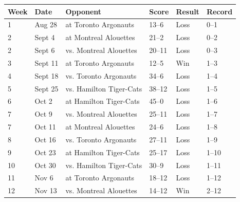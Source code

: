 \documentclass{article}
\begin{document}
\begin{tabular}{llllll}
\toprule
Week & Date & Opponent & Score & Result & Record \\
\midrule
1 & Aug 28 & at Toronto Argonauts & 13–6 & Loss & 0–1 \\
2 & Sept 4 & at Montreal Alouettes & 21–2 & Loss & 0–2 \\
2 & Sept 6 & vs. Montreal Alouettes & 20–11 & Loss & 0–3 \\
3 & Sept 11 & at Toronto Argonauts & 12–5 & Win & 1–3 \\
4 & Sept 18 & vs. Toronto Argonauts & 34–6 & Loss & 1–4 \\
5 & Sept 25 & vs. Hamilton Tiger-Cats & 38–12 & Loss & 1–5 \\
6 & Oct 2 & at Hamilton Tiger-Cats & 45–0 & Loss & 1–6 \\
7 & Oct 9 & vs. Montreal Alouettes & 25–11 & Loss & 1–7 \\
7 & Oct 11 & at Montreal Alouettes & 24–6 & Loss & 1–8 \\
8 & Oct 16 & vs. Toronto Argonauts & 27–11 & Loss & 1–9 \\
9 & Oct 23 & at Hamilton Tiger-Cats & 25–17 & Loss & 1–10 \\
10 & Oct 30 & vs. Hamilton Tiger-Cats & 30–9 & Loss & 1–11 \\
11 & Nov 6 & at Toronto Argonauts & 18–12 & Loss & 1–12 \\
12 & Nov 13 & vs. Montreal Alouettes & 14–12 & Win & 2–12 \\
\bottomrule
\end{tabular}
\end{document}
